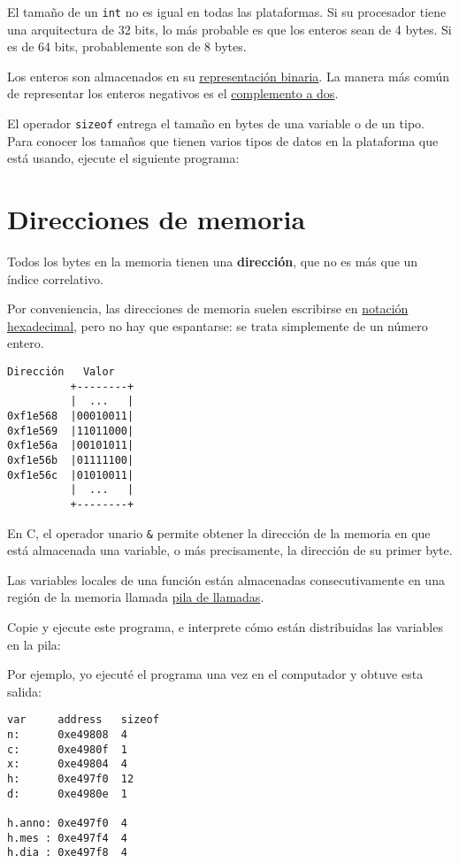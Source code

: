 El tamaño de un \lstinline!int! no es igual en todas las plataformas. Si
su procesador tiene una arquitectura de 32 bits, lo más probable es que
los enteros sean de 4 bytes. Si es de 64 bits, probablemente son de 8
bytes.

Los enteros son almacenados en su
\href{http://en.wikipedia.org/wiki/Binary\_numeral\_system}{representación
binaria}. La manera más común de representar los enteros negativos es el
\href{http://en.wikipedia.org/wiki/Two's\_complement}{complemento a
dos}.

El operador \lstinline!sizeof! entrega el tamaño en bytes de una
variable o de un tipo. Para conocer los tamaños que tienen varios tipos
de datos en la plataforma que está usando, ejecute el siguiente
programa:

\section{Direcciones de memoria}

Todos los bytes en la memoria tienen una \textbf{dirección}, que no es
más que un índice correlativo.

Por conveniencia, las direcciones de memoria suelen escribirse en
\href{http://en.wikipedia.org/wiki/Hexadecimal}{notación hexadecimal},
pero no hay que espantarse: se trata simplemente de un número entero.

\begin{verbatim}
Dirección   Valor
          +--------+
          |  ...   |
0xf1e568  |00010011|
0xf1e569  |11011000|
0xf1e56a  |00101011|
0xf1e56b  |01111100|
0xf1e56c  |01010011|
          |  ...   |
          +--------+
\end{verbatim}

En C, el operador unario \lstinline!&! permite obtener la dirección de
la memoria en que está almacenada una variable, o más precisamente, la
dirección de su primer byte.

Las variables locales de una función están almacenadas consecutivamente
en una región de la memoria llamada
\href{http://es.wikipedia.org/wiki/Pila\_de\_llamadas}{pila de
llamadas}.

Copie y ejecute este programa, e interprete cómo están distribuidas las
variables en la pila:

Por ejemplo, yo ejecuté el programa una vez en el computador y obtuve
esta salida:

\begin{verbatim}
var     address   sizeof
n:      0xe49808  4
c:      0xe4980f  1
x:      0xe49804  4
h:      0xe497f0  12
d:      0xe4980e  1

h.anno: 0xe497f0  4
h.mes : 0xe497f4  4
h.dia : 0xe497f8  4
\end{verbatim}

